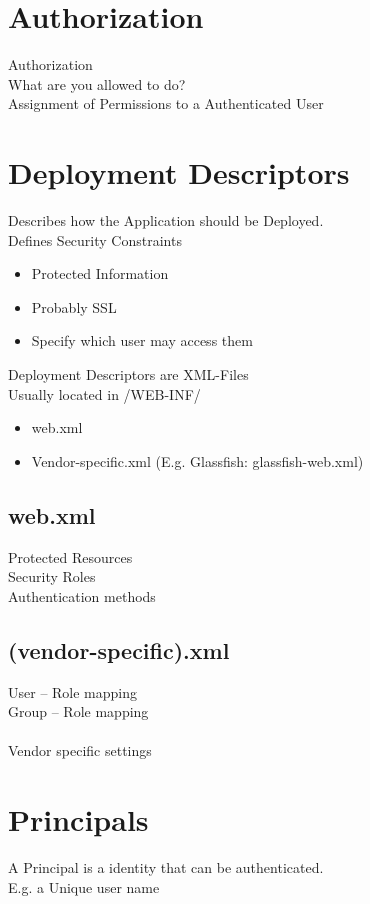 \documentclass[12pt,a4paper]{report}
\begin{document}
\section{Authorization}
Authorization\\
What are you allowed to do?\\
Assignment of Permissions to a Authenticated User\\


\section{Deployment Descriptors}
Describes how the Application should be Deployed.\\
Defines Security Constraints\\
\begin{itemize}
	\item Protected Information
	\item Probably SSL
	\item Specify which user may access them
\end{itemize}
Deployment Descriptors are XML-Files\\
Usually located in /WEB-INF/\\
\begin{itemize}
	\item web.xml
	\item Vendor-specific.xml (E.g. Glassfish: glassfish-web.xml)
\end{itemize}

\subsection*{web.xml}
Protected Resources\\
Security Roles\\
Authentication methods\\

\subsection*{(vendor-specific).xml}
User – Role mapping\\
Group – Role mapping\\
\\
Vendor specific settings\\

\section{Principals}
A Principal is a identity that can be authenticated.\\
E.g. a Unique user name\\
\end{document}
